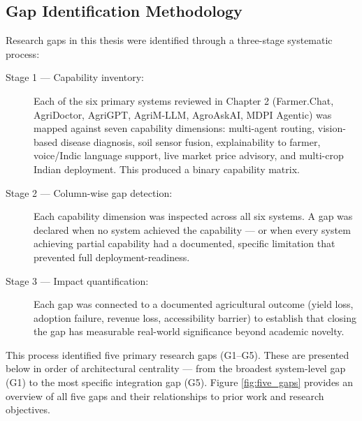 \documentclass[12pt,a4paper]{article}
\begin{document}
\subsection{Gap Identification Methodology}
Research gaps in this thesis were identified through a three-stage systematic process:
\begin{description}
    \item[Stage 1 --- Capability inventory:] Each of the six primary systems reviewed in Chapter 2 (Farmer.\allowbreak Chat, AgriDoctor, AgriGPT, AgriM-LLM, AgroAskAI, MDPI Agentic) was mapped against seven capability dimensions: multi-agent routing, vision-based disease diagnosis, soil sensor fusion, explainability to farmer, voice/Indic language support, live market price advisory, and multi-crop Indian deployment. This produced a binary capability matrix.
    \item[Stage 2 --- Column-wise gap detection:] Each capability dimension was inspected across all six systems. A gap was declared when no system achieved the capability --- or when every system achieving partial capability had a documented, specific limitation that prevented full deployment-readiness.
    \item[Stage 3 --- Impact quantification:] Each gap was connected to a documented agricultural outcome (yield loss, adoption failure, revenue loss, accessibility barrier) to establish that closing the gap has measurable real-world significance beyond academic novelty.
\end{description}

This process identified five primary research gaps (G1--G5). These are presented below in order of architectural centrality --- from the broadest system-level gap (G1) to the most specific integration gap (G5). Figure \ref{fig:five_gaps} provides an overview of all five gaps and their relationships to prior work and research objectives.
\end{document}
